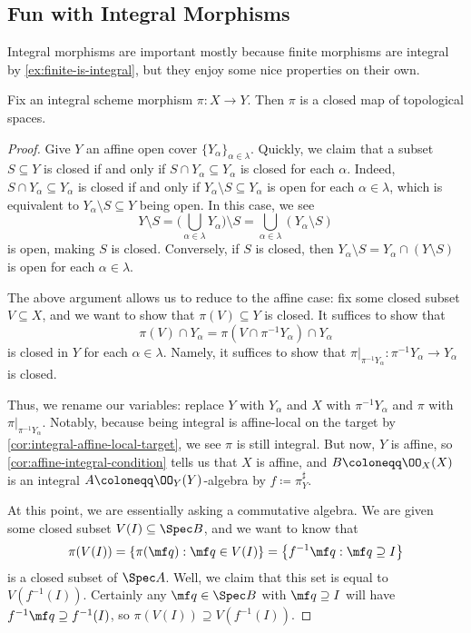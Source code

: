 \documentclass[../notes.tex]{subfiles}
\begin{document}
\subsection{Fun with Integral Morphisms}
Integral morphisms are important mostly because finite morphisms are integral by \autoref{ex:finite-is-integral}, but they enjoy some nice properties on their own.
\begin{lemma}
	Fix an integral scheme morphism $\pi\colon X\to Y$. Then $\pi$ is a closed map of topological spaces.
\end{lemma}
\begin{proof}
	Give $Y$ an affine open cover $\{Y_\alpha\}_{\alpha\in\lambda}$. Quickly, we claim that a subset $S\subseteq Y$ is closed if and only if $S\cap Y_\alpha\subseteq Y_\alpha$ is closed for each $\alpha$. Indeed, $S\cap Y_\alpha\subseteq Y_\alpha$ is closed if and only if $Y_\alpha\setminus S\subseteq Y_\alpha$ is open for each $\alpha\in\lambda$, which is equivalent to $Y_\alpha\setminus S\subseteq Y$ being open. In this case, we see
	\[Y\setminus S=\Bigg(\bigcup_{\alpha\in\lambda}Y_\alpha\Bigg)\setminus S=\bigcup_{\alpha\in\lambda}(Y_\alpha\setminus S)\]
	is open, making $S$ is closed. Conversely, if $S$ is closed, then $Y_\alpha\setminus S=Y_\alpha\cap(Y\setminus S)$ is open for each $\alpha\in\lambda$.

	The above argument allows us to reduce to the affine case: fix some closed subset $V\subseteq X$, and we want to show that $\pi(V)\subseteq Y$ is closed. It suffices to show that
	\[\pi(V)\cap Y_\alpha=\pi(V\cap\pi^{-1}Y_\alpha)\cap Y_\alpha\]
	is closed in $Y$ for each $\alpha\in\lambda$. Namely, it suffices to show that $\pi|_{\pi^{-1}Y_\alpha}\colon\pi^{-1}Y_\alpha\to Y_\alpha$ is closed.

	Thus, we rename our variables: replace $Y$ with $Y_\alpha$ and $X$ with $\pi^{-1}Y_\alpha$ and $\pi$ with $\pi|_{\pi^{-1}Y_\alpha}$. Notably, because being integral is affine-local on the target by \autoref{cor:integral-affine-local-target}, we see $\pi$ is still integral. But now, $Y$ is affine, so \autoref{cor:affine-integral-condition} tells us that $X$ is affine, and $B\coloneqq\OO_X(X)$ is an integral $A\coloneqq\OO_Y(Y)$-algebra by $f\coloneqq\pi^\sharp_Y$.

	At this point, we are essentially asking a commutative algebra. We are given some closed subset $V(I)\subseteq\Spec B$, and we want to know that
	\[\pi(V(I))=\{\pi(\mf q):\mf q\in V(I)\}=\left\{f^{-1}\mf q:\mf q\supseteq I\right\}\]
	is a closed subset of $\Spec A$. Well, we claim that this set is equal to $V\left(f^{-1}(I)\right)$. Certainly any $\mf q\in\Spec B$ with $\mf q\supseteq I$ will have $f^{-1}\mf q\supseteq f^{-1}(I)$, so $\pi(V(I))\supseteq V\left(f^{-1}(I)\right)$.
	

\end{proof}
\end{document}
